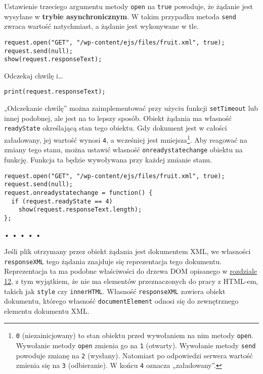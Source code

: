   
Ustawienie trzeciego argumentu metody \texttt{open} na \texttt{true} powoduje, że żądanie jest wysyłane w \textbf{trybie asynchronicznym}. W takim przypadku metoda \texttt{send} zwraca wartość natychmiast, a żądanie jest wykonywane w tle.

  
\begin{verbatim} 
request.open("GET", "/wp-content/ejs/files/fruit.xml", true);
request.send(null);
show(request.responseText);
 \end{verbatim}
  
Odczekaj chwilę i…

  
\begin{verbatim} 
print(request.responseText);
 \end{verbatim}
  
„Odczekanie chwilę” można zaimplementować przy użyciu funkcji \texttt{setTimeout} lub innej podobnej, ale jest na to lepszy sposób. Obiekt żądania ma własność \texttt{readyState} określającą stan tego obiektu. Gdy dokument jest w całości załadowany, jej wartość wynosi \texttt{4}, a wcześniej jest mniejsza\footnote{\texttt{0} (niezainicjowany) to stan obiektu przed wywołaniem na nim metody \texttt{open}. Wywołanie metody \texttt{open} zmienia go na \texttt{1} (otwarty). Wywołanie metody \texttt{send} powoduje zmianę na \texttt{2} (wysłany). Natomiast po odpowiedzi serwera wartość zmienia się na \texttt{3} (odbieranie). W końcu \texttt{4} oznacza „załadowany”.}. Aby reagować na zmiany tego stanu, można ustawić własność \texttt{onreadystatechange} obiektu na funkcję. Funkcja ta będzie wywoływana przy każdej zmianie stanu.

  
\begin{verbatim} 
request.open("GET", "/wp-content/ejs/files/fruit.xml", true);
request.send(null);
request.onreadystatechange = function() {
  if (request.readyState == 4)
    show(request.responseText.length);
};
 \end{verbatim}


\begin{center}
• • • • •
\end{center}

  
Jeśli plik otrzymany przez obiekt żądania jest dokumentem XML, we własności \texttt{responseXML} tego żądania znajduje się reprezentacja tego dokumentu. Reprezentacja ta ma podobne właściwości do drzewa DOM opisanego w \hyperref[chap:12]{rozdziale 12}, z tym wyjątkiem, że nie ma elementów przeznaczonych do pracy z HTML-em, takich jak \texttt{style} czy \texttt{innerHTML}. Własność \texttt{responseXML} zawiera obiekt dokumentu, którego własność \texttt{documentElement} odnosi się do zewnętrznego elementu dokumentu XML.

